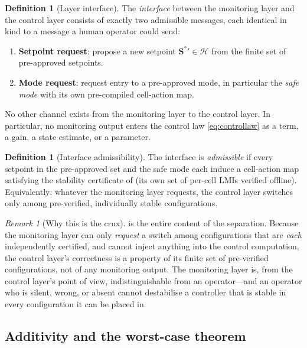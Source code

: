 \documentclass[11pt,a4paper,twocolumn]{article}
\theoremstyle{thmstyle}
\theoremstyle{definition}
\newtheorem{definition}[theorem]{Definition}
\theoremstyle{remark}
\newtheorem{remark}[theorem]{Remark}
\newcommand{\Hs}{\mathcal{H}}
\newcommand{\Ss}{\mathbf{S}}
\newcommand{\Sstar}{\Ss^{\ast}}
\begin{document}
\begin{definition}[Layer interface]
\label{def:interface}
The \emph{interface} between the monitoring layer and the control layer
consists of exactly two admissible messages, each identical in kind to a
message a human operator could send:
\begin{enumerate}[label=\textup{(\roman*)},leftmargin=2.2em,itemsep=1pt]
\item \textbf{Setpoint request}: propose a new setpoint
$\Sstar{}'\in\Hs$ from the finite set of pre-approved setpoints.
\item \textbf{Mode request}: request entry to a pre-approved mode, in
particular the \emph{safe mode} with its own pre-compiled cell-action map.
\end{enumerate}
No other channel exists from the monitoring layer to the control layer. In
particular, no monitoring output enters the control law \eqref{eq:controllaw}
as a term, a gain, a state estimate, or a parameter.
\end{definition}

\begin{definition}[Interface admissibility]
\label{def:admissible-iface}
The interface is \emph{admissible} if every setpoint in the pre-approved
set and the safe mode each induce a cell-action map satisfying the
stability certificate of  (its own set of per-cell LMIs
verified offline). Equivalently: whatever the monitoring layer requests,
the control layer switches only among pre-verified, individually stable
configurations.
\end{definition}

\begin{remark}[Why this is the crux]
\label{rem:crux}
 is the entire content of the separation. Because the
monitoring layer can only \emph{request} a switch among configurations
that are \emph{each} independently certified, and cannot inject anything
into the control computation, the control layer's correctness is a
property of its finite set of pre-verified configurations, not of any
monitoring output. The monitoring layer is, from the control layer's
point of view, indistinguishable from an operator---and an operator who
is silent, wrong, or absent cannot destabilise a controller that is
stable in every configuration it can be placed in.
\end{remark}

\subsection{Additivity and the worst-case theorem}
\end{document}
